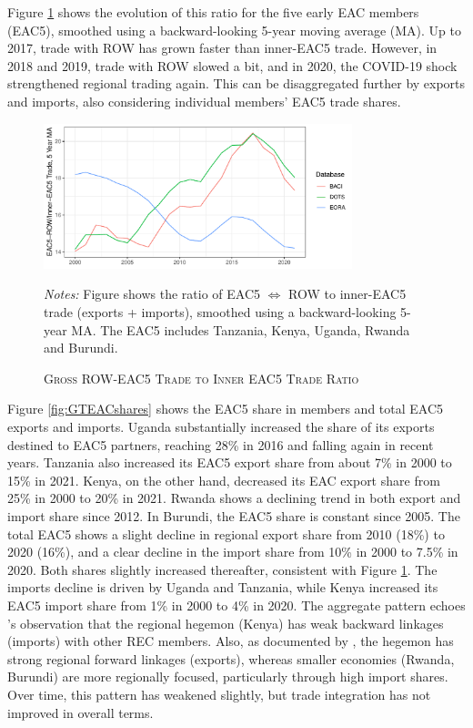 \documentclass[a4paper]{article}
\begin{document}
Figure \ref{fig:EAC_ROW_Ratios} shows the evolution of this ratio for the five early EAC members (EAC5), smoothed using a backward-looking 5-year moving average (MA). Up to 2017, trade with ROW has grown faster than inner-EAC5 trade. However, in 2018 and 2019, trade with ROW slowed a bit, and in 2020, the COVID-19 shock strengthened regional trading again. This can be disaggregated further by exports and imports, also considering individual members' EAC5 trade shares. \newline 

\begin{figure}[h!] 
\centering
\caption{\label{fig:EAC_ROW_Ratios} \textsc{Gross ROW-EAC5 Trade to Inner EAC5 Trade Ratio}}
\vspace{2mm}
\includegraphics[width = 0.8\textwidth]{"ROW_EAC5_Trade_Ratios_5YMA.pdf"} \\
\raggedright
\scriptsize 
\emph{Notes:} Figure shows the ratio of EAC5 $\Leftrightarrow$ ROW to inner-EAC5 trade (exports + imports), smoothed using a backward-looking 5-year MA. The EAC5 includes Tanzania, Kenya, Uganda, Rwanda and Burundi.
\end{figure}
\FloatBarrier


Figure \ref{fig:GTEACshares} shows the EAC5 share in members and total EAC5 exports and imports. Uganda substantially increased the share of its exports destined to EAC5 partners, reaching 28\% in 2016 and falling again in recent years. Tanzania also increased its EAC5 export share from about 7\% in 2000 to 15\% in 2021. Kenya, on the other hand, decreased its EAC export share from 25\% in 2000 to 20\% in 2021. Rwanda shows a declining trend in both export and import share since 2012. In Burundi, the EAC5 share is constant since 2005. The total EAC5 shows a slight decline in regional export share from 2010 (18\%) to 2020 (16\%), and a clear decline in the import share from 10\% in 2000 to 7.5\% in 2020. Both shares slightly increased thereafter, consistent with Figure \ref{fig:EAC_ROW_Ratios}. The imports decline is driven by Uganda and Tanzania, while Kenya increased its EAC5 import share from 1\% in 2000 to 4\% in 2020. The aggregate pattern echoes \citet{obasaju2021regional}'s observation that the regional hegemon (Kenya) has weak backward linkages (imports) with other REC members. Also, as documented by \citet{engel2016sacu}, the hegemon has strong regional forward linkages (exports), whereas smaller economies (Rwanda, Burundi) are more regionally focused, particularly through high import shares. Over time, this pattern has weakened slightly, but trade integration has not improved in overall terms. 
\end{document}
